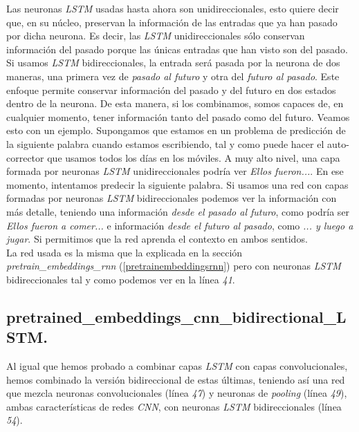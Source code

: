 \documentclass[11pt]{article}
\begin{document}
Las neuronas \textit{LSTM} usadas hasta ahora son unidireccionales, esto quiere decir que, en su núcleo, preservan la información de las entradas que ya han pasado por dicha neurona. Es decir, las \textit{LSTM} unidireccionales sólo conservan información del pasado porque las únicas entradas que han visto son del pasado. Si usamos \textit{LSTM} bidireccionales, la entrada será pasada por la neurona de dos maneras, una primera vez de \textit{pasado al futuro} y otra del \textit{futuro al pasado}. Este enfoque permite conservar información del pasado y del futuro en dos estados dentro de la neurona. De esta manera, si los combinamos, somos capaces de, en cualquier momento, tener información tanto del pasado como del futuro. Veamos esto con un ejemplo. Supongamos que estamos en un problema de predicción de la siguiente palabra cuando estamos escribiendo, tal y como puede hacer el auto-corrector que usamos todos los días en los móviles. A muy alto nivel, una capa formada por neuronas \textit{LSTM} unidireccionales podría ver \textit{Ellos fueron...}. En ese momento, intentamos predecir la siguiente palabra. Si usamos una red con capas formadas por neuronas \textit{LSTM} bidireccionales podemos ver la información con más detalle, teniendo una información \textit{desde el pasado al futuro}, como podría ser \textit{Ellos fueron a comer...} e información \textit{desde el futuro al pasado}, como \textit{... y luego a jugar}. Si permitimos que la red aprenda el contexto en ambos sentidos. \\

La red usada es la misma que la explicada en la sección \textit{pretrain\_embeddings\_rnn} (\ref{pretrainembeddingsrnn}) pero con neuronas \textit{LSTM} bidireccionales tal y como podemos ver en la línea \textit{41}.



\subsection{pretrained\_embeddings\_cnn\_bidirectional\_LSTM.}

Al igual que hemos probado a combinar capas \textit{LSTM} con capas convolucionales, hemos combinado la versión bidireccional de estas últimas, teniendo así una red que mezcla neuronas convolucionales (línea \textit{47}) y neuronas de \textit{pooling} (línea \textit{49}), ambas características de redes \textit{CNN}, con neuronas \textit{LSTM} bidireccionales (línea \textit{54}).
\end{document}
